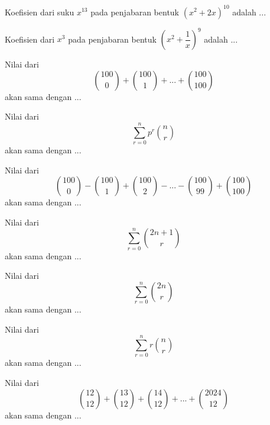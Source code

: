 \documentclass[11pt]{scrartcl}
\begin{document}
\begin{problem}
Koefisien dari suku $x^{13}$ pada penjabaran bentuk $\left(x^2 + 2x\right)^{10}$ adalah ...
\end{problem}

\begin{problem}
Koefisien dari $x^3$ pada penjabaran bentuk $\left(x^2 + \dfrac{1}{x}\right)^9$ adalah ...
\end{problem}

\begin{problem}
Nilai dari $$\binom{100}{0} + \binom{100}{1} + ... + \binom{100}{100}$$ akan sama dengan ...
\end{problem}

\begin{problem}
Nilai dari $$\sum_{r=0}^n p^r \binom{n}{r}$$ akan sama dengan ...
\end{problem}

\begin{problem}
Nilai dari $$\binom{100}{0} - \binom{100}{1} + \binom{100}{2} - ... - \binom{100}{99} + \binom{100}{100}$$ akan sama dengan ...
\end{problem}

\begin{problem}
Nilai dari $$\sum_{r = 0}^n \binom{2n + 1}{r}$$ akan sama dengan ...
\end{problem}

\begin{problem}
Nilai dari $$\sum_{r = 0}^n \binom{2n}{r}$$ akan sama dengan ...
\end{problem}

\begin{problem}
Nilai dari $$\sum_{r = 0}^n r\binom{n}{r}$$ akan sama dengan ...
\end{problem}

\begin{problem}
Nilai dari $$\binom{12}{12} + \binom{13}{12} + \binom{14}{12} + ... + \binom{2024}{12}$$ akan sama dengan ...
\end{problem}
\end{document}
